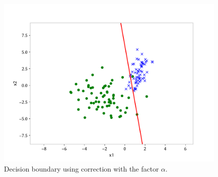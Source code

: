 \begin{answer}
    \begin{figure}[h]
        \centering
        \includegraphics*[width=.7\linewidth]{../src/posonly/part_f.pdf}
        \caption{Decision boundary using correction with the factor $\alpha$.}        
    \end{figure}
\end{answer}
